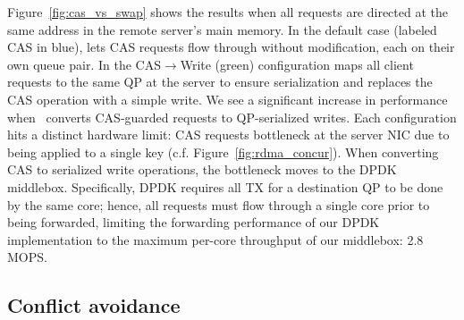 Figure~\ref{fig:cas_vs_swap} shows the results when all requests are
directed at the same address in the remote server's main memory.  In
the default case (labeled CAS in blue), {\sword} lets CAS requests
flow through without modification, each on their own queue pair.  In
the CAS$\rightarrow$Write (green) configuration {\sword} maps all
client requests to the same QP at the server to ensure serialization
and replaces the CAS operation with a simple write.
%
%
We see a significant increase in performance when \sword\ converts
CAS-guarded requests to QP-serialized writes.  Each configuration hits
a distinct hardware limit: CAS requests bottleneck at the server NIC
due to being applied to a single key
(c.f. Figure~\ref{fig:rdma_concur}).  When converting CAS to
serialized write operations, the bottleneck moves to the DPDK
middlebox.
Specifically, DPDK requires all TX for a destination QP to be done by
the same core; hence,
all requests must flow through a single core prior to being forwarded, limiting the forwarding performance of our
DPDK implementation to the maximum per-core
throughput of our middlebox: 2.8 MOPS.



\subsection{Conflict avoidance}

